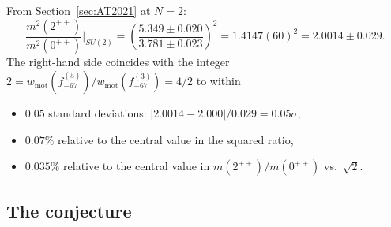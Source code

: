 \documentclass[11pt,a4paper]{amsart}
\theoremstyle{definition}
\begin{document}
From Section~\ref{sec:AT2021} at $N = 2$:
\begin{equation}
\frac{m^{2}(2^{++})}{m^{2}(0^{++})}\bigg|_{SU(2)} = \left(\frac{5.349 \pm 0.020}{3.781 \pm 0.023}\right)^{2} = 1.4147(60)^{2} = 2.0014 \pm 0.029.
\end{equation}
The right-hand side coincides with the integer $2 = w_{\mathrm{mot}}(f_{-67}^{(5)}) / w_{\mathrm{mot}}(f_{-67}^{(3)}) = 4 / 2$
to within
\begin{itemize}\setlength\itemsep{2pt}
\item $0.05$ standard deviations: $|2.0014 - 2.000| / 0.029 = 0.05\sigma$,
\item $0.07\%$ relative to the central value in the squared ratio,
\item $0.035\%$ relative to the central value in $m(2^{++})/m(0^{++})$ vs.\ $\sqrt{2}$.
\end{itemize}

\subsection{The conjecture}
\end{document}
